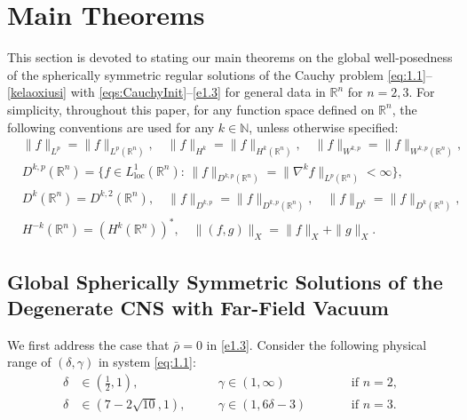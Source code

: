 \documentclass[11pt,reqno]{amsart}
\numberwithin{rk}{section}
\numberwithin{prop}{section}
\numberwithin{mydef}{section}
\numberwithin{lem}{section}
\numberwithin{equation}{section}
\numberwithin{thm}{section}
\begin{document}
\section{Main Theorems}\label{maintheorem}
This section is devoted to stating our main theorems on the global well-posedness of the spherically symmetric regular solutions 
of the Cauchy problem \eqref{eq:1.1}--\eqref{kelaoxiusi} with \eqref{eqs:CauchyInit}--\eqref{e1.3}  for general data in $\mathbb{R}^n$ for $n=2,3$.  For simplicity, throughout this paper,
for any function space defined on $\mathbb{R}^n$, 
the following conventions are used for any $k\in \mathbb{N}$,
unless otherwise specified: 
\begin{equation} \label{eulerspace}
\begin{aligned}
&\|f\|_{L^p}=\|f\|_{L^p(\mathbb{R}^n)},\quad \|f\|_{H^k}=\|f\|_{H^k(\mathbb{R}^n)},\quad  \|f\|_{W^{k,p}}=\|f\|_{W^{k,p}(\mathbb{R}^n)},\\[2pt]
&D^{k,p}(\mathbb{R}^n)
=\big\{f\in L^1_{\mathrm{loc}}(\mathbb{R}^n):\,\|f\|_{D^{k,p}(\mathbb{R}^n)}=\|\nabla^k f\|_{L^p(\mathbb{R}^n)}<\infty\big\},\\[2pt] & D^k(\mathbb{R}^n)=D^{k,2}(\mathbb{R}^n),   \quad \|f\|_{D^{k,p}}=\|f\|_{D^{k,p}(\mathbb{R}^n)},\quad  \|f\|_{D^{k}}=\|f\|_{D^{k}(\mathbb{R}^n)},\\[2pt]
&  H^{-k}(\mathbb{R}^n)=(H^k(\mathbb{R}^n))^*,\quad \|(f,g)\|_X=\|f\|_X+\|g\|_X.\end{aligned}
\end{equation}

\subsection{Global Spherically Symmetric Solutions of the Degenerate \textbf{CNS} with Far-Field Vacuum}
We first address the case that  $\bar\rho=0$ in \eqref{e1.3}. Consider the following physical range of $(\delta,\gamma)$ in system \eqref{eq:1.1}:
\begin{equation}\label{cd1}
\begin{aligned}
\delta&\in (\frac{1}{2},1),\quad &&\gamma\in (1,\infty) \ \quad &&&\text{if $n=2$},\\
\delta&\in (7-2\sqrt{10},1),\quad &&\gamma\in (1,6\delta-3) \ \quad &&&\text{if $n=3$}.    
\end{aligned}
\end{equation}
\end{document}
